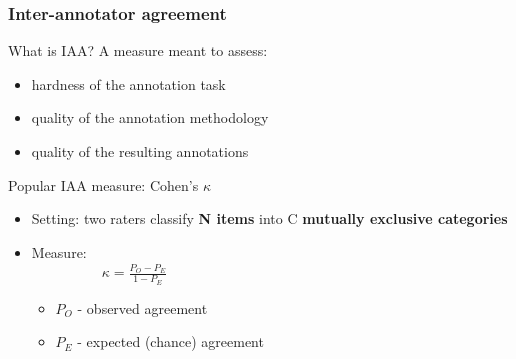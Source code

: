 \documentclass[xcolor=dvipsnames]{beamer}
\begin{document}
\begin{frame}
  \vspace*{-5pt}
  \frametitle{Inter-annotator agreement}


\begin{block}{What is IAA?}
A measure meant to assess:
\begin{itemize}
\item hardness of the annotation task
\item quality of the annotation methodology
\item quality of the resulting annotations
\end{itemize}
\end{block}

\begin{block}{Popular IAA measure: Cohen's $\kappa$}
\begin{itemize}
\item Setting: two raters classify \textbf{N items} into C \textbf{mutually exclusive categories}
\item Measure: \\
~~~~~~~~~~$\kappa = \frac{P_O - P_E}{1-P_E}$
   \begin{itemize}
   \item $P_O$ - observed agreement
   \item $P_E$ - expected (chance) agreement
   \end{itemize}
\end{itemize}
\end{block}

\end{frame}
\end{document}
